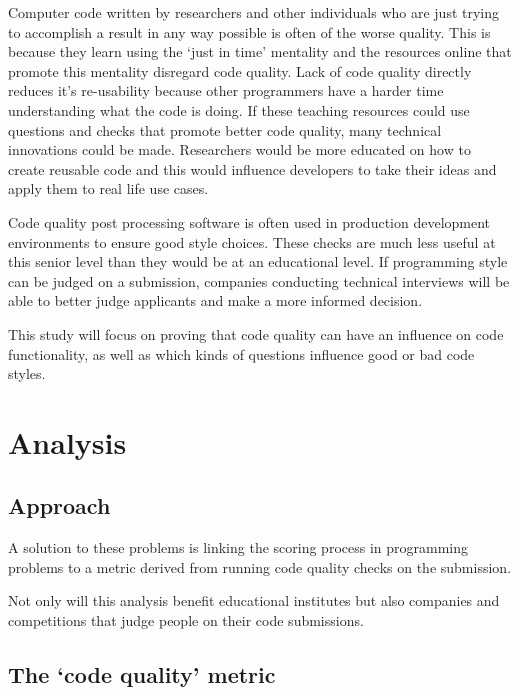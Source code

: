 \documentclass{article}
\begin{document}
Computer code written by researchers and other individuals who are just
trying to accomplish a result in any way possible is often of the worse
quality. This is because they learn using the `just in time' mentality
and the resources online that promote this mentality disregard code
quality. \citet{justintimeteaching} Lack of code quality directly
reduces it's re-usability because other programmers have a harder time
understanding what the code is doing. If these teaching resources could
use questions and checks that promote better code quality, many
technical innovations could be made. Researchers would be more educated
on how to create reusable code and this would influence developers to
take their ideas and apply them to real life use cases.
\citet{reusability}

Code quality post processing software is often used in production
development environments to ensure good style choices. These checks are
much less useful at this senior level than they would be at an
educational level. If programming style can be judged on a submission,
companies conducting technical interviews will be able to better judge
applicants and make a more informed decision.

This study will focus on proving that code quality can have an influence
on code functionality, as well as which kinds of questions influence
good or bad code styles.

\section{Analysis}\label{analysis}

\subsection{Approach}\label{approach}

A solution to these problems is linking the scoring process in
programming problems to a metric derived from running code quality
checks on the submission.

Not only will this analysis benefit educational institutes but also
companies and competitions that judge people on their code submissions.

\subsection{\texorpdfstring{The `code quality'
metric}{The code quality metric}}\label{the-code-quality-metric}
\end{document}
